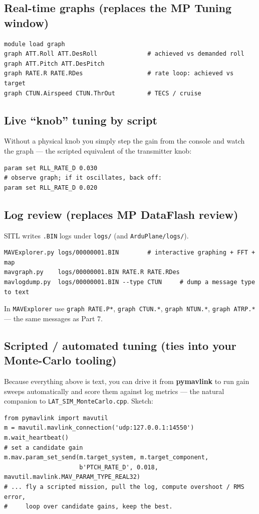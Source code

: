 \documentclass[11pt,a4paper]{article}
\newcommand{\pp}[1]{\texttt{#1}} %
\begin{document}
\subsection{Real-time graphs (replaces the MP Tuning window)}
\begin{lstlisting}
module load graph
graph ATT.Roll ATT.DesRoll              # achieved vs demanded roll
graph ATT.Pitch ATT.DesPitch
graph RATE.R RATE.RDes                  # rate loop: achieved vs target
graph CTUN.Airspeed CTUN.ThrOut         # TECS / cruise
\end{lstlisting}

\subsection{Live ``knob'' tuning by script}
Without a physical knob you simply step the gain from the console and watch the
graph --- the scripted equivalent of the transmitter knob:
\begin{lstlisting}
param set RLL_RATE_D 0.030
# observe graph; if it oscillates, back off:
param set RLL_RATE_D 0.020
\end{lstlisting}

\subsection{Log review (replaces MP DataFlash review)}
SITL writes \pp{.BIN} logs under \pp{logs/} (and \pp{ArduPlane/logs/}).
\begin{lstlisting}
MAVExplorer.py logs/00000001.BIN        # interactive graphing + FFT + map
mavgraph.py    logs/00000001.BIN RATE.R RATE.RDes
mavlogdump.py  logs/00000001.BIN --type CTUN     # dump a message type to text
\end{lstlisting}
In \pp{MAVExplorer} use \pp{graph RATE.P*}, \pp{graph CTUN.*}, \pp{graph NTUN.*},
\pp{graph ATRP.*} --- the same messages as Part 7.

\subsection{Scripted / automated tuning (ties into your Monte-Carlo tooling)}
Because everything above is text, you can drive it from \textbf{pymavlink} to run
gain sweeps automatically and score them against log metrics --- the natural
companion to \pp{LAT\_SIM\_MonteCarlo.cpp}. Sketch:
\begin{lstlisting}
from pymavlink import mavutil
m = mavutil.mavlink_connection('udp:127.0.0.1:14550')
m.wait_heartbeat()
# set a candidate gain
m.mav.param_set_send(m.target_system, m.target_component,
                     b'PTCH_RATE_D', 0.018, mavutil.mavlink.MAV_PARAM_TYPE_REAL32)
# ... fly a scripted mission, pull the log, compute overshoot / RMS error,
#     loop over candidate gains, keep the best.
\end{lstlisting}
\end{document}
